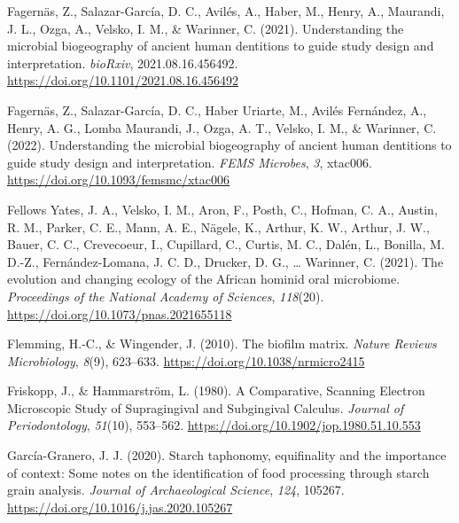 \documentclass[
  letterpaper,
]{book}
\newlength{\cslhangindent}
\newlength{\cslentryspacingunit} %
\newenvironment{CSLReferences}[2] %
 {%
  \setlength{\parindent}{0pt}
  \ifodd #1
  \let\oldpar\par
  \def\par{\hangindent=\cslhangindent\oldpar}
  \fi
  \setlength{\parskip}{#2\cslentryspacingunit}
 }%
 {}
\begin{document}
\begin{CSLReferences}{1}{0}
\leavevmode{}%
Fagernäs, Z., Salazar-García, D. C., Avilés, A., Haber, M., Henry, A.,
Maurandi, J. L., Ozga, A., Velsko, I. M., \& Warinner, C. (2021).
Understanding the microbial biogeography of ancient human dentitions to
guide study design and interpretation. \emph{bioRxiv},
2021.08.16.456492. \url{https://doi.org/10.1101/2021.08.16.456492}

\leavevmode{}%
Fagernäs, Z., Salazar-García, D. C., Haber Uriarte, M., Avilés
Fernández, A., Henry, A. G., Lomba Maurandi, J., Ozga, A. T., Velsko, I.
M., \& Warinner, C. (2022). Understanding the microbial biogeography of
ancient human dentitions to guide study design and interpretation.
\emph{FEMS Microbes}, \emph{3}, xtac006.
\url{https://doi.org/10.1093/femsmc/xtac006}

\leavevmode{}%
Fellows Yates, J. A., Velsko, I. M., Aron, F., Posth, C., Hofman, C. A.,
Austin, R. M., Parker, C. E., Mann, A. E., Nägele, K., Arthur, K. W.,
Arthur, J. W., Bauer, C. C., Crevecoeur, I., Cupillard, C., Curtis, M.
C., Dalén, L., Bonilla, M. D.-Z., Fernández-Lomana, J. C. D., Drucker,
D. G., \ldots{} Warinner, C. (2021). The evolution and changing ecology
of the {African} hominid oral microbiome. \emph{Proceedings of the
National Academy of Sciences}, \emph{118}(20).
\url{https://doi.org/10.1073/pnas.2021655118}

\leavevmode{}%
Flemming, H.-C., \& Wingender, J. (2010). The biofilm matrix.
\emph{Nature Reviews Microbiology}, \emph{8}(9), 623--633.
\url{https://doi.org/10.1038/nrmicro2415}

\leavevmode{}%
Friskopp, J., \& Hammarström, L. (1980). A {Comparative}, {Scanning
Electron Microscopic Study} of {Supragingival} and {Subgingival
Calculus}. \emph{Journal of Periodontology}, \emph{51}(10), 553--562.
\url{https://doi.org/10.1902/jop.1980.51.10.553}

\leavevmode{}%
García-Granero, J. J. (2020). Starch taphonomy, equifinality and the
importance of context: {Some} notes on the identification of food
processing through starch grain analysis. \emph{Journal of
Archaeological Science}, \emph{124}, 105267.
\url{https://doi.org/10.1016/j.jas.2020.105267}


\end{CSLReferences}
\end{document}
